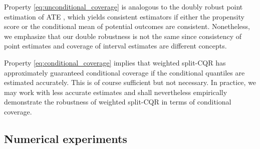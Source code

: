 Property \eqref{eq:unconditional_coverage} is analogous to the
doubly robust point estimation of ATE
\citep[e.g.][]{robins1994estimation, kang2007demystifying}, which
yields consistent estimators if either the propensity score or the
conditional mean of potential outcomes are consistent. Nonetheless, we
emphasize that our double robustness is not the same since consistency
of point estimates and coverage of interval estimates are different
concepts.%

Property \eqref{eq:conditional_coverage} implies that weighted
split-CQR has approximately guaranteed conditional coverage if the
conditional quantiles are estimated accurately. This is of course
sufficient but not necessary. In practice, we may work with less
accurate estimates and shall nevertheless empirically demonstrate the
robustness of weighted split-CQR in terms of conditional coverage.



\subsection{Numerical experiments}\label{subsec:simul}

